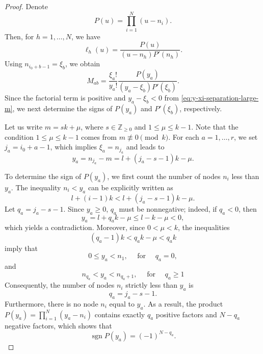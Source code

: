 \documentclass[preprint,3p,10pt]{elsarticle}
\theoremstyle{definition}
\begin{document}
\begin{proof}
Denote
\begin{equation}
    P(u)=\prod_{i=1}^{N}(u-n_i).
\end{equation}
Then, for \(h=1,\ldots,N\), we have
\begin{equation}
    \ell_h(u)
    =
    \frac{P(u)}{(u-n_h)P'(n_h)}.
\end{equation}
Using \(n_{i_0+b-1}=\xi_b\), we obtain
\begin{equation}
    M_{ab}
    =
    \frac{\xi_a!}{y_a!}
    \frac{P(y_a)}
    {(y_a-\xi_b)P'(\xi_b)}.
    \label{eq:M-cauchy-raw-large-m}
\end{equation}
Since the factorial term is positive and $y_a - \xi_b < 0$ from \eqref{eq:y-xi-separation-large-m}, we next determine the signs of $P(y_a)$ and $P'(\xi_b)$, respectively.


Let us write $m = sk + \mu$, where $s \in \mathbb{Z}_{\ge0}$ and $1 \le \mu \le k-1$. Note that the condition $1 \le \mu \le k-1$ comes from $m \not\equiv 0 \pmod{k}$. For each $a = 1, \ldots, r$, we set $j_a = i_0 + a - 1$, which implies $\xi_a = n_{j_a}$ and leads to
\begin{equation}
    y_a = n_{j_a} - m= l + (j_a - s - 1)k - \mu.
\end{equation}

To determine the sign of $P(y_a)$, we first count the number of nodes $n_i$ less than $y_a$. The inequality $n_i < y_a$ can be explicitly written as
\begin{equation}
    l+(i-1)k < l+(j_a-s-1)k-\mu.
\end{equation}
Let $q_a = j_a - s - 1$. Since $y_a \ge 0$, $q_a$ must be nonnegative; indeed, if $q_a < 0$, then $$y_a = l + q_ak - \mu \le l - k - \mu < 0,$$ which yields a contradiction. Moreover, since $0 < \mu < k$, the inequalities
\begin{equation}
    (q_a-1)k < q_ak-\mu < q_ak
\end{equation}
imply that 
$$0\le y_a<n_{1}, \quad\text{ for }\quad q_a =0,$$
and
$$n_{q_a}<y_a<n_{q_{a}+1}, \quad\text{ for }\quad q_a \ge 1$$
Consequently, the number of nodes $n_i$ strictly less than $y_a$ is
\begin{equation}
    q_a = j_a - s - 1.
\end{equation}
Furthermore, there is no node $n_i$ equal to $y_a$. 
As a result, the product $P(y_a) = \prod_{i=1}^{N}(y_a-n_i)$ contains exactly $q_a$ positive factors and $N-q_a$ negative factors, which shows that
\begin{equation}
    \operatorname{sgn}P(y_a) = (-1)^{N-q_a}. \label{eq:sign-P-y-large-m}
\end{equation}


\end{proof}
\end{document}
